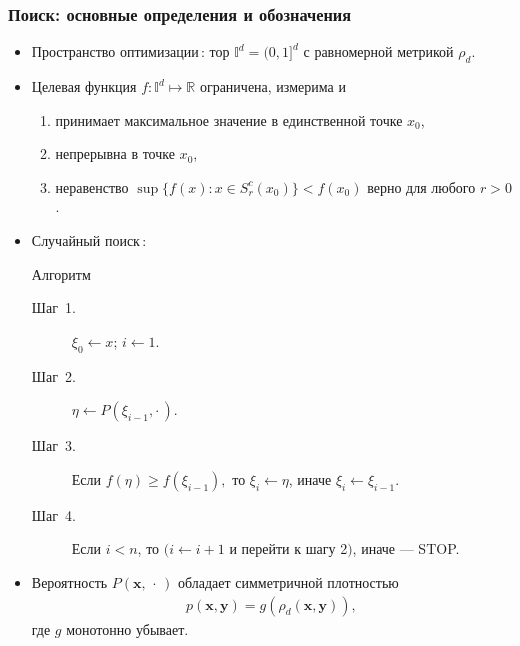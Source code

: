 \documentclass[pdf, intlimits, 9pt, unicode]{beamer} %
\begin{document}
\begin{frame}
    \frametitle{Поиск: основные определения и обозначения}

    \begin{itemize}
        \item<1-> \alert{Пространство оптимизации\,:} тор
        $\mathbb{I}^d=(0,1]^d$ с равномерной метрикой $\rho_d$.
        \item<2-> \alert{Целевая функция}
        $f:\mathbb{I}^d\mapsto\mathbb{R}$
        ограничена, измерима и
        \begin{enumerate}
            \item принимает максимальное значение в единственной точке
            $x_0$,
            \item непрерывна в точке $x_0$,
            \item неравенство $\sup\{f(x):x\in S_r^c(x_0)\}<f(x_0)$ верно
            для любого $r>0$.
        \end{enumerate}
        \item<3-> \alert{Случайный поиск\,:}
        \begin{center} {Алгоритм}
        \end{center}
        \begin{description}
            \item[Шаг~1.] $\xi_0 \gets x$; $i \gets 1$.
            \item[Шаг~2.] $\eta \gets P(\xi_{i-1},\cdot\,)$.
            \item[Шаг~3.] Если $f(\eta)\geq f(\xi_{i-1}),$ то $\xi_{i}
            \gets \eta$, иначе $\xi_{i} \gets \xi_{i-1}$.
            \item[Шаг~4.] Если $i < n$, то $\big(i \leftarrow i + 1$ и
            перейти к шагу 2$\big)$, иначе --- STOP.
        \end{description}
        \item<4-> Вероятность $P(\mathbf{x},\,\cdot\,)$ обладает
        \alert{симметричной} плотностью
        \begin{gather*}
            p(\mathbf{x},\mathbf{y})=g(\rho_d(\mathbf{x},\mathbf{y})),
        \end{gather*}
        где $g$ монотонно убывает.
    \end{itemize}
\end{frame}
\end{document}
